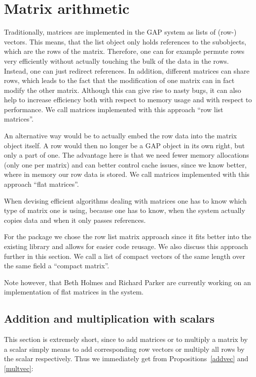 
\section{Matrix arithmetic}
\label{sec:matarith}

Traditionally, matrices are implemented in the {\sf GAP} system as
lists of (row-) vectors. This means, that the list object only
holds references to the subobjects, which are the rows of the matrix.
Therefore, one can for example permute rows very efficiently without
actually touching the bulk of the data in the rows. Instead, one can
just redirect references. In addition, different matrices can share
rows, which leads to the fact that the modification of one matrix
can in fact modify the other matrix. Although this can give rise to
nasty bugs, it can also help to increase efficiency both with respect
to memory usage and with respect to performance. We call matrices
implemented with this approach ``row list matrices''.

An alternative way would be to actually embed the row data into the
matrix object itself. A row would then no longer be a {\sf GAP} object
in its own right, but only a part of one. The advantage here is that
we need fewer memory allocations (only one per matrix) and can better
control cache issues, since we know better, where in memory our row data
is stored. We call matrices implemented with this approach ``flat
matrices''.

When devising efficient algorithms dealing with matrices one has to know
which type of matrix one is using, because one has to know, when the
system actually copies data and when it only passes references.

For the {\cvec} package we chose the row list matrix approach since it fits
better into the existing {\GAP} library and allows for easier code reusage.
We also discuss this approach further in this section. We call a list
of compact vectors of the same length over the same field a ``compact
matrix''.

Note however, that Beth Holmes and Richard Parker are currently working
on an implementation of flat matrices in the {\GAP} system.


\subsection{Addition and multiplication with scalars}
\label{addmulsca}

This section is extremely short, since to add matrices or
to multiply a matrix by a scalar simply means to add corresponding
row vectors or multiply all rows by the scalar respectively.
Thus we immediately get from Propositions~\ref{addvec} and
\ref{multvec}:

